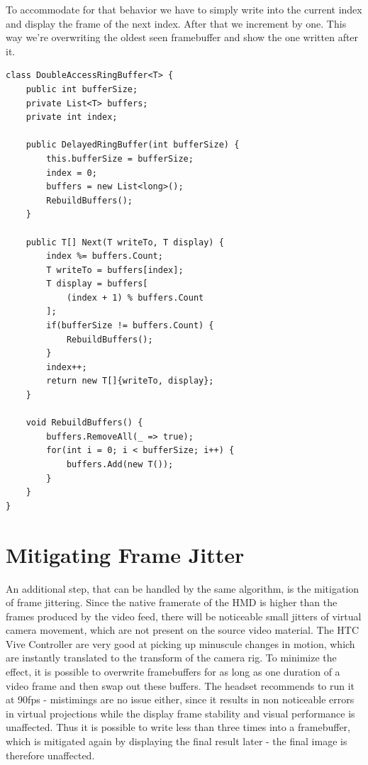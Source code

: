 To accommodate for that behavior we have to simply write into the current index 
and display the frame of the next index. After that we increment by one. This 
way we’re overwriting the oldest seen framebuffer and show the one written 
after it.

\begin{lstlisting}
class DoubleAccessRingBuffer<T> {
	public int bufferSize;
	private List<T> buffers;
	private int index;
	
	public DelayedRingBuffer(int bufferSize) {
		this.bufferSize = bufferSize;
		index = 0;
		buffers = new List<long>();
		RebuildBuffers();
	}
	
	public T[] Next(T writeTo, T display) {
		index %= buffers.Count;
		T writeTo = buffers[index];
		T display = buffers[
			(index + 1) % buffers.Count
		];
		if(bufferSize != buffers.Count) {
			RebuildBuffers();
		}
		index++;
		return new T[]{writeTo, display};
	}
	
	void RebuildBuffers() {
		buffers.RemoveAll(_ => true);
		for(int i = 0; i < bufferSize; i++) {
			buffers.Add(new T());
		}
	}
}
\end{lstlisting}



\section{Mitigating Frame Jitter}

An additional step, that can be handled by the same algorithm, is the 
mitigation of frame jittering. Since the native framerate of the HMD is higher 
than the frames produced by the video feed, there will be noticeable small 
jitters of virtual camera movement, which are not present on the source video 
material. The HTC Vive Controller are very good at picking up minuscule 
changes in motion, which are instantly translated to the transform of the 
camera rig.
\newline
To minimize the effect, it is possible to overwrite framebuffers for as long as 
one duration of a video frame and then swap out these buffers. The headset 
recommends to run it at 90fps - mistimings are no issue either, since it 
results in non noticeable errors in virtual projections while the display frame 
stability and visual performance is unaffected. Thus it is possible to write 
less than three times into a framebuffer, which is mitigated again by 
displaying the final result later - the final image is therefore unaffected.

